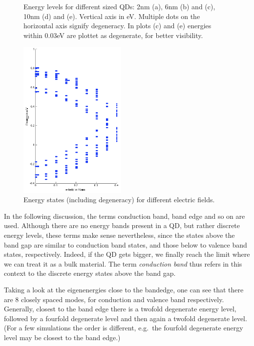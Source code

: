 \begin{figure}
\begin{subfigure}{60px}
		\caption{}
	\end{subfigure}
	\caption{Energy levels for different sized QDs: 2nm (a), 6nm (b) and (c), 10nm (d) and (e). Vertical axis in eV. Multiple dots on the horizontal axis signify degeneracy. In plots (c) and (e) energies within 0.03eV are plottet as degenerate, for better visibility.}
	\label{fig:e-levels}	
\end{figure}

\begin{figure}
	\centering
	\includegraphics[width=200px]{Fig/Plots/r25v.png}
	\caption{Energy states (including degeneracy) for different electric fields.}
	\label{fig:EvsVolt}
\end{figure}


\begin{REMARK}
In the following discussion, the terms conduction band, band edge and so on are used. Although there are no energy bands present in a QD, but rather discrete energy levels, these terms make sense nevertheless, since the states above the band gap are similar to conduction band states, and those below to valence band states, respectively. Indeed, if the QD gets bigger, we finally reach the limit where we can treat it as a bulk material. The term \textit{conduction band} thus refers in this context to the discrete energy states above the band gap.
\end{REMARK}
	
Taking a look at the eigenenergies close to the bandedge, one can see that there are 8 closely spaced modes, for conduction and valence band respectively. Generally, closest to the band edge there is a twofold degenerate energy level, followed by a fourfold degenerate level and then again a twofold degenerate level. (For a few simulations the order is different, e.g.~the fourfold degenerate energy level may be closest to the band edge.)
	
